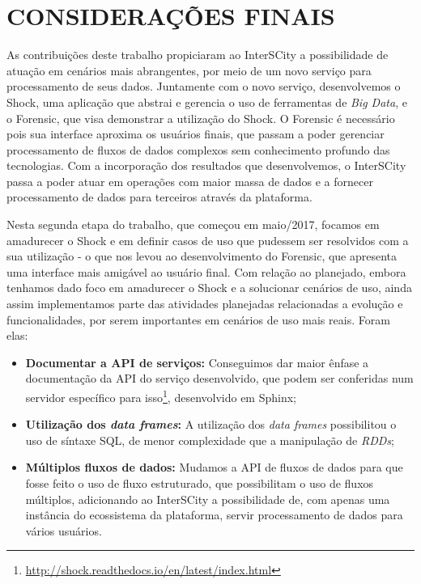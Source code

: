 \chapter{CONSIDERAÇÕES FINAIS}
\label{chapter:final}

As contribuições deste trabalho propiciaram ao InterSCity a possibilidade de
atuação em cenários mais abrangentes, por meio de um novo serviço
para processamento de seus dados. Juntamente com o novo serviço, desenvolvemos
o Shock, uma aplicação que abstrai e gerencia o uso de ferramentas de
\textit{Big Data}, e o Forensic, que visa demonstrar a utilização do Shock.
O Forensic é necessário pois sua interface aproxima os usuários finais, que
passam a poder gerenciar processamento de fluxos de dados complexos sem
conhecimento profundo das tecnologias.
Com a incorporação dos resultados que desenvolvemos, o InterSCity passa a poder
atuar em operações com maior massa de dados e a fornecer processamento de dados
para terceiros através da plataforma.

Nesta segunda etapa do trabalho, que começou em maio/2017, focamos em
amadurecer o Shock e em definir casos de uso que pudessem ser resolvidos com
a sua utilização - o que nos levou ao desenvolvimento do Forensic, que apresenta
uma interface mais amigável ao usuário final. Com relação ao planejado, embora
tenhamos dado foco em amadurecer o Shock e a solucionar cenários de uso, ainda
assim implementamos parte das atividades planejadas relacionadas a evolução e
funcionalidades, por serem importantes em cenários de uso mais reais. Foram
elas:

\begin{itemize}
    \item \textbf{Documentar a API de serviços:} Conseguimos dar maior ênfase a
        documentação da API do serviço desenvolvido, que podem ser conferidas
        num servidor específico para isso\footnote{\url{http://shock.readthedocs.io/en/latest/index.html}},
        desenvolvido em Sphinx;
    \item \textbf{Utilização dos \textit{data frames}:} A utilização dos
        \textit{data frames} possibilitou o uso de síntaxe SQL, de menor
        complexidade que a manipulação de \textit{RDDs};
    \item \textbf{Múltiplos fluxos de dados:} Mudamos a API de fluxos de dados
        para que fosse feito o uso de fluxo estruturado, que
        possibilitam o uso de fluxos múltiplos, adicionando ao
        InterSCity a possibilidade de, com apenas uma instância do ecossistema
        da plataforma, servir processamento de dados para vários usuários.
\end{itemize}

